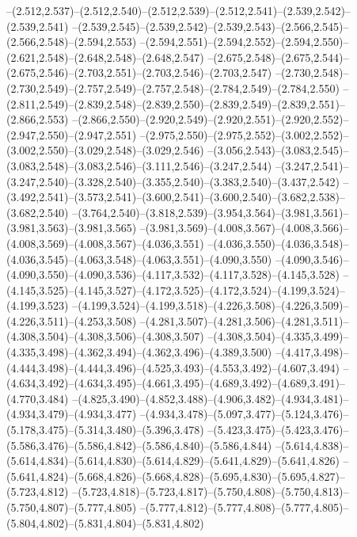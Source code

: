   --(2.512,2.537)--(2.512,2.540)--(2.512,2.539)--(2.512,2.541)--(2.539,2.542)--(2.539,2.541)%
  --(2.539,2.545)--(2.539,2.542)--(2.539,2.543)--(2.566,2.545)--(2.566,2.548)--(2.594,2.553)%
  --(2.594,2.551)--(2.594,2.552)--(2.594,2.550)--(2.621,2.548)--(2.648,2.548)--(2.648,2.547)%
  --(2.675,2.548)--(2.675,2.544)--(2.675,2.546)--(2.703,2.551)--(2.703,2.546)--(2.703,2.547)%
  --(2.730,2.548)--(2.730,2.549)--(2.757,2.549)--(2.757,2.548)--(2.784,2.549)--(2.784,2.550)%
  --(2.811,2.549)--(2.839,2.548)--(2.839,2.550)--(2.839,2.549)--(2.839,2.551)--(2.866,2.553)%
  --(2.866,2.550)--(2.920,2.549)--(2.920,2.551)--(2.920,2.552)--(2.947,2.550)--(2.947,2.551)%
  --(2.975,2.550)--(2.975,2.552)--(3.002,2.552)--(3.002,2.550)--(3.029,2.548)--(3.029,2.546)%
  --(3.056,2.543)--(3.083,2.545)--(3.083,2.548)--(3.083,2.546)--(3.111,2.546)--(3.247,2.544)%
  --(3.247,2.541)--(3.247,2.540)--(3.328,2.540)--(3.355,2.540)--(3.383,2.540)--(3.437,2.542)%
  --(3.492,2.541)--(3.573,2.541)--(3.600,2.541)--(3.600,2.540)--(3.682,2.538)--(3.682,2.540)%
  --(3.764,2.540)--(3.818,2.539)--(3.954,3.564)--(3.981,3.561)--(3.981,3.563)--(3.981,3.565)%
  --(3.981,3.569)--(4.008,3.567)--(4.008,3.566)--(4.008,3.569)--(4.008,3.567)--(4.036,3.551)%
  --(4.036,3.550)--(4.036,3.548)--(4.036,3.545)--(4.063,3.548)--(4.063,3.551)--(4.090,3.550)%
  --(4.090,3.546)--(4.090,3.550)--(4.090,3.536)--(4.117,3.532)--(4.117,3.528)--(4.145,3.528)%
  --(4.145,3.525)--(4.145,3.527)--(4.172,3.525)--(4.172,3.524)--(4.199,3.524)--(4.199,3.523)%
  --(4.199,3.524)--(4.199,3.518)--(4.226,3.508)--(4.226,3.509)--(4.226,3.511)--(4.253,3.508)%
  --(4.281,3.507)--(4.281,3.506)--(4.281,3.511)--(4.308,3.504)--(4.308,3.506)--(4.308,3.507)%
  --(4.308,3.504)--(4.335,3.499)--(4.335,3.498)--(4.362,3.494)--(4.362,3.496)--(4.389,3.500)%
  --(4.417,3.498)--(4.444,3.498)--(4.444,3.496)--(4.525,3.493)--(4.553,3.492)--(4.607,3.494)%
  --(4.634,3.492)--(4.634,3.495)--(4.661,3.495)--(4.689,3.492)--(4.689,3.491)--(4.770,3.484)%
  --(4.825,3.490)--(4.852,3.488)--(4.906,3.482)--(4.934,3.481)--(4.934,3.479)--(4.934,3.477)%
  --(4.934,3.478)--(5.097,3.477)--(5.124,3.476)--(5.178,3.475)--(5.314,3.480)--(5.396,3.478)%
  --(5.423,3.475)--(5.423,3.476)--(5.586,3.476)--(5.586,4.842)--(5.586,4.840)--(5.586,4.844)%
  --(5.614,4.838)--(5.614,4.834)--(5.614,4.830)--(5.614,4.829)--(5.641,4.829)--(5.641,4.826)%
  --(5.641,4.824)--(5.668,4.826)--(5.668,4.828)--(5.695,4.830)--(5.695,4.827)--(5.723,4.812)%
  --(5.723,4.818)--(5.723,4.817)--(5.750,4.808)--(5.750,4.813)--(5.750,4.807)--(5.777,4.805)%
  --(5.777,4.812)--(5.777,4.808)--(5.777,4.805)--(5.804,4.802)--(5.831,4.804)--(5.831,4.802)%
